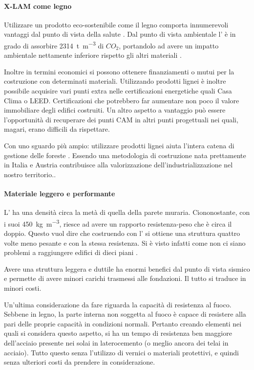 \paragraph{X-LAM come legno}
Utilizzare un prodotto eco-sostenibile come il legno comporta innumerevoli vantaggi dal punto di vista della salute \cite{EnergyCost}. Dal punto di vista ambientale l'\xlam{} è in grado di assorbire \SI{2314}{\tonne \per \cubic\metre} di $CO_2$, portandolo ad avere un impatto ambientale nettamente inferiore rispetto gli altri materiali \cite{hammond2011inventory}.

Inoltre in termini economici si possono ottenere finanziamenti o mutui per la costruzione con determinati materiali. 
Utilizzando prodotti lignei è inoltre possibile acquisire vari punti extra nelle certificazioni energetiche quali Casa Clima o LEED. 
Certificazioni che potrebbero far aumentare non poco il valore immobiliare degli edifici costruiti. 
Un altro aspetto a vantaggio può essere l'opportunità di recuperare dei punti CAM in altri punti progettuali nei quali, magari, erano difficili da rispettare.

Con uno sguardo più ampio: utilizzare prodotti lignei aiuta l'intera catena di gestione delle foreste \cite{callegari2010production}. 
Essendo una metodologia di costruzione nata prettamente in Italia e Austria contribuisce alla valorizzazione dell'industrializzazione nel nostro territorio..
\paragraph{Materiale leggero e performante}
L'\xlam{} ha una densità circa la metà di quella della parete muraria. 
Ciononostante, con i suoi \SI{450}{\kilogram\per\cubic\metre}, riesce ad avere un rapporto resistenza-peso che è circa il doppio. 
Questo vuol dire che costruendo con l'\xlam{} si ottiene una struttura quattro volte meno pesante e con la stessa resistenza. 
Si è visto infatti come non ci siano problemi a raggiungere edifici di dieci piani \cite{10storey}.

Avere una struttura leggera e duttile ha enormi benefici dal punto di vista sismico e permette di avere minori carichi trasmessi alle fondazioni. 
Il tutto si traduce in minori costi.

Un'ultima considerazione da fare riguarda la capacità di resistenza al fuoco. 
Sebbene in legno, la parte interna non soggetta al fuoco è capace di resistere alla pari delle proprie capacità in condizioni normali. 
Pertanto creando elementi nei quali si considera questo aspetto, si ha un tempo di resistenza ben maggiore dell'acciaio presente nei solai in laterocemento (o meglio ancora dei telai in acciaio). 
Tutto questo senza l'utilizzo di vernici o materiali protettivi, e quindi senza ulteriori costi da prendere in considerazione.
%
